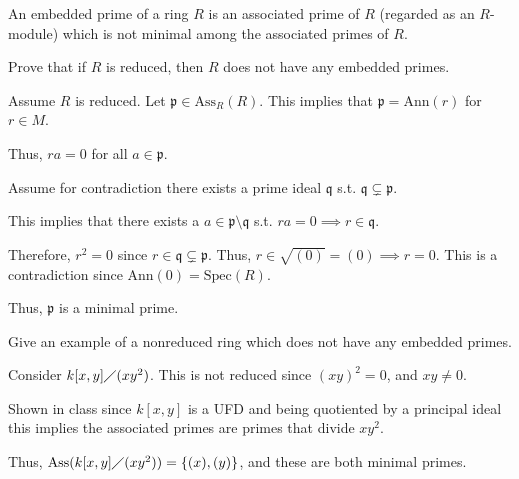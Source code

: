\documentclass[12pt, letterpaper]{article}
\newcommand{\p}{\mathfrak{p}}
\newcommand{\Spec}{\mathrm{Spec}}
\newcommand{\Ass}{\mathrm{Ass}}
\newcommand{\Ann}{\mathrm{Ann}}
\newcommand{\mf}[1]{\mathfrak{#1}}
\begin{document}
\begin{problem}{}
    An embedded prime of a ring $R$ is an associated prime of $R$ (regarded as an $R$-module)
which is not minimal among the associated primes of $R$.
\end{problem}

\begin{subproblem}{}
    Prove that if $R$ is reduced, then $R$ does not have any embedded primes.
\end{subproblem}
\begin{problemproof}
    Assume $R$ is reduced. Let $\p \in \Ass_R(R)$. This implies that $\p = \Ann(r)$ for $r \in M$.
    
    Thus, $ra = 0$ for all $a \in \p$.

    Assume for contradiction there exists a prime ideal $\mf{q}$ s.t. $\mf{q} \subsetneq \p$.

    This implies that there exists a $a \in \p \setminus \mf{q}$ s.t. $ra=0 \implies r \in \mf{q}$.

    Therefore, $r^2=0$ since $r \in \mf{q} \subsetneq \p$. Thus, $r \in \sqrt{(0)} = (0) \implies r =0$. This is a contradiction since $\Ann(0)=\Spec(R)$.

    Thus, $\p$ is a minimal prime.
\end{problemproof}

\begin{subproblem}{}
    Give an example of a nonreduced ring which does not have any embedded primes.
\end{subproblem}
\begin{problemproof}
    Consider $k[x,y] \diagup (xy^2)$. This is not reduced since $(xy)^2=0$, and $xy \neq 0$.

    Shown in class since  $k[x,y]$ is a UFD and being quotiented by a principal ideal this implies the associated primes are primes that divide $xy^2$.

    Thus, $\Ass(k[x,y] \diagup (xy^2))=\{(x),(y)\}$, and these are both minimal primes.
\end{problemproof}
\end{document}
